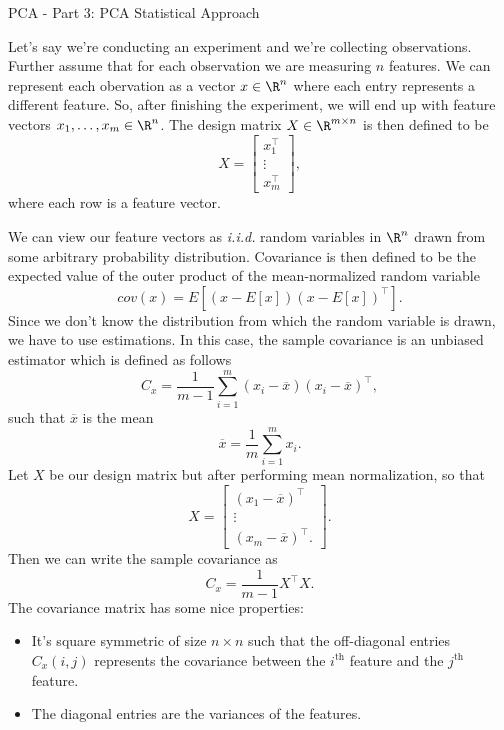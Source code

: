 \pagebreak
\begin{entry}[4]{PCA - Part 3: PCA Statistical Approach}

\begin{entrysection}
Let's say we're conducting an experiment and we're collecting observations. Further assume that for each observation we are measuring $n$ features. We can represent each obervation as a vector $x \in \R^n$ where each entry represents a different feature. So, after finishing the experiment, we will end up with feature vectors $x_1,\ldots,x_m \in \R^n$. The design matrix $X \in \R^{m \times n}$ is then defined to be
\[ X = \begin{bmatrix}x_1^{\top} \\ \vdots \\ x_m^{\top} \end{bmatrix} ,\]
where each row is a feature vector.
\end{entrysection}

\begin{entrysection}
We can view our feature vectors as \textit{i.i.d.} random variables in $\R^n$ drawn from some arbitrary probability distribution. Covariance is then defined to be the expected value of the outer product of the mean-normalized random variable
\[ cov(x) = E[ (x - E[x])(x - E[x])^{\top} ]. \]
Since we don't know the distribution from which the random variable is drawn, we have to use estimations. In this case, the sample covariance is an unbiased estimator which is defined as follows
\[ C_x = \frac{1}{m - 1} \sum_{i = 1}^{m}(x_i - \overline{x})(x_i - \overline{x})^{\top}, \]
such that $\overline{x}$ is the mean 
\[\overline{x} = \frac{1}{m} \sum_{i = 1}^{m} x_i.\]
Let $X$ be our design matrix but after performing mean normalization, so that
\[ X = \begin{bmatrix} (x_1 - \overline{x})^{\top} \\ \vdots \\ (x_m - \overline{x})^{\top}. \end{bmatrix}. \]
Then we can write the sample covariance as
\[ C_x = \frac{1}{m - 1} X^{\top} X. \]
The covariance matrix has some nice properties:
\begin{itemize}
    \item It's square symmetric of size $n \times n$ such that the off-diagonal entries $C_x(i, j)$ represents the covariance between the $i^{\text{th}}$ feature and the $j^{\text{th}}$ feature.
    \item The diagonal entries are the variances of the features.
\end{itemize}
\end{entrysection}


\end{entry}
